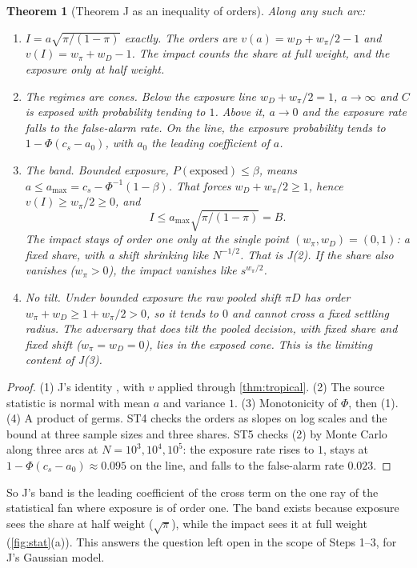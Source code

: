 \documentclass[11pt]{article}
\newtheorem{theorem}{Theorem}\newtheorem{proposition}[theorem]{Proposition}\newtheorem{lemma}[theorem]{Lemma}\newtheorem{corollary}[theorem]{Corollary}\newtheorem{conjecture}[theorem]{Conjecture}
\theoremstyle{definition}\newtheorem{definition}[theorem]{Definition}\newtheorem{remark}[theorem]{Remark}\newtheorem{example}[theorem]{Example}
\begin{document}
\begin{theorem}[Theorem J as an inequality of orders]\label{thm:Jfan}
Along any such arc:
\begin{enumerate}
\item[(1)] $I=a\sqrt{\pi/(1-\pi)}$ exactly. The orders are $v(a)=w_D+w_\pi/2-1$ and $v(I)=w_\pi+w_D-1$. The impact counts the share at full
  weight, and the exposure only at half weight.
\item[(2)] \emph{The regimes are cones.} Below the exposure line $w_D+w_\pi/2=1$, $a\to\infty$ and $C$ is exposed with probability tending to $1$.
  Above it, $a\to0$ and the exposure rate falls to the false-alarm rate. On the line, the exposure probability tends to
  $1-\Phi(c_s-a_0)$, with $a_0$ the leading coefficient of $a$.
\item[(3)] \emph{The band.} Bounded exposure, $P(\text{exposed})\le\beta$, means $a\le a_{\max}=c_s-\Phi^{-1}(1-\beta)$. That forces $w_D+w_\pi/2\ge1$, hence
  $v(I)\ge w_\pi/2\ge0$, and
  \[
  I\le a_{\max}\sqrt{\pi/(1-\pi)}=B .
  \]
  The impact stays of order one only at the single point $(w_\pi,w_D)=(0,1)$: a fixed share, with a shift shrinking like $N^{-1/2}$. That is
  J(2). If the share also vanishes ($w_\pi>0$), the impact vanishes like $s^{w_\pi/2}$.
\item[(4)] \emph{No tilt.} Under bounded exposure the raw pooled shift $\pi D$ has order $w_\pi+w_D\ge1+w_\pi/2>0$, so it tends to $0$ and cannot cross a
  fixed settling radius. The adversary that does tilt the pooled decision, with fixed share and fixed shift ($w_\pi=w_D=0$), lies in the
  exposed cone. This is the limiting content of J(3).
\end{enumerate}
\end{theorem}

\begin{proof}
(1) J's identity \cite[proof of Theorem J(2)]{Lab}, with $v$ applied through \cref{thm:tropical}. (2) The source statistic is normal with mean $a$
and variance $1$. (3) Monotonicity of $\Phi$, then (1). (4) A product of germs. ST4 checks the orders as slopes on log scales and the bound at
three sample sizes and three shares. ST5 checks (2) by Monte Carlo along three arcs at $N=10^3,10^4,10^5$: the exposure rate rises to $1$,
stays at $1-\Phi(c_s-a_0)\approx0.095$ on the line, and falls to the false-alarm rate $0.023$.
\end{proof}

So J's band is the leading coefficient of the cross term on the one ray of the statistical fan where exposure is of order one. The band
exists because exposure sees the share at half weight ($\sqrt\pi$), while the impact sees it at full weight (\cref{fig:stat}(a)). This
answers the question left open in the scope of Steps 1--3, for J's Gaussian model.
\end{document}
